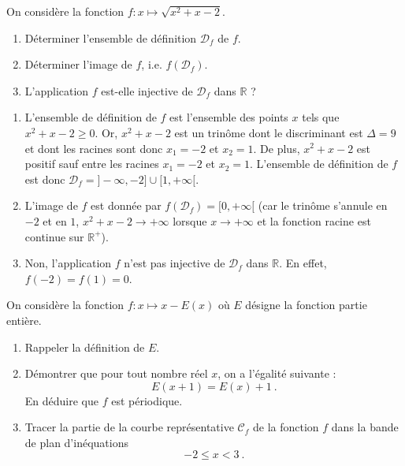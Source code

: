 \documentclass[a4paper, 11pt,openany]{book}%
\newtheorem[L]{thm}{Théorème}[section]
\newtheorem[M]{propo}[thm]{Proposition}
\newtheorem[M]{prop}[thm]{Propriété}
\newtheorem[M]{coro}[thm]{Corollaire}
\newtheorem[M]{lem}[thm]{Lemme}
\newtheorem[M,bodystyle=]{defi}[thm]{Définition}
\newtheorem[M,bodystyle=]{remark}[thm]{Remarque}
\newtheorem[M,bodystyle=]{met}[thm]{Méthode}
\newtheorem[M,bodystyle=]{ret}[thm]{A retenir}
\newtheorem[M,bodystyle=]{idee}[thm]{Idée}
\newtheorem[style=S,underline=false,bodystyle=]{exem}[thm]{Exemple}
\newtheorem[S,underline=false,bodystyle=]{exo}[thm]{Exercice}
\newtheorem[S,underline=false,bodystyle=]{appli}[thm]{Application}
\newtheorem[S,underline=false,bodystyle=]{sol}[thm]{Solution}
\newtheorem[S,underline=false,bodystyle=]{hypo}[thm]{Hypothesis}
\newtheorem[S,underline=false,bodystyle=]{nota}[thm]{Notation}
\newcommand{\R}{\mathbb{R}}
\newcommand{\calD}{\mathcal{D}}
\begin{document}
\begin{exo}
On considère la fonction 
$ f : x \mapsto \sqrt{x^2 + x - 2}$.
\begin{enumerate}
\item Déterminer l'ensemble de définition $\calD_f$ de $f$.
\item Déterminer l'image de $f$, i.e. $f(\calD_f)$.
\item L'application $f$ est-elle injective de $\calD_f$ dans $\R$ ?
\end{enumerate}
\end{exo}


\begin{sol}
\begin{enumerate}
\item L'ensemble de définition de $f$ est l'ensemble des points $x$ tels que $x^2 + x -2 \geqslant 0$. Or, $x^2 + x -2$ est un trinôme dont le discriminant est $\Delta = 9$ et dont les racines sont donc $x_1 = -2$ et $x_2 =1$. De plus, $x^2 +x -2$ est positif sauf entre les racines $x_1 = -2$ et $x_2= 1$. L'ensemble de définition de $f$ est donc $\calD_f = ]-\infty,-2] \cup [1, +\infty[$.
\item L'image de $f$ est donnée par $f(\calD_f) = [0,+\infty[$ (car le trinôme s'annule en $-2$ et en $1$, $x^2+x-2 \to + \infty$ lorsque $x \to + \infty$ et la fonction racine est continue sur $\R^+$).
\item Non, l'application $f$ n'est pas injective de $\calD_f$ dans $\R$. En effet, $f(-2) =  f(1)= 0$.
\end{enumerate}
\end{sol}





\begin{exo}

	On considère la fonction $f\colon x \mapsto x - E(x)$ où $E$ désigne la fonction partie entière.
	\begin{enumerate}
		\item Rappeler la définition de $E$.
		\item Démontrer que pour tout nombre réel $x$, on a l'égalité suivante :
		\[
			E(x+1)	= E(x) + 1 \ .
		\]
		En déduire que $f$ est périodique. 
		\item Tracer la partie de la courbe représentative $\mathcal{C}_f$ de la fonction $f$ dans la bande de plan d'inéquations
		\[
			-2 \leqslant x < 3 \ .
		\]
	\end{enumerate}

\end{exo}
\end{document}

